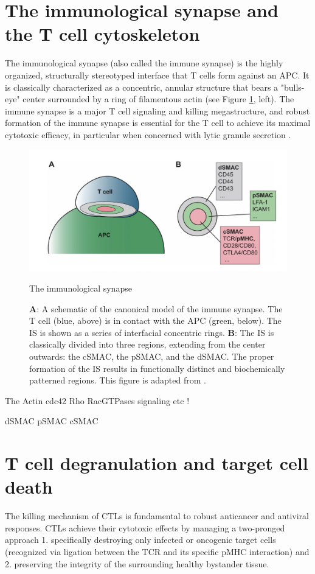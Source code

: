 \section{The immunological synapse and the T cell cytoskeleton}
The immunological synapse (also called the immune synapse) is the highly organized, structurally stereotyped interface that T cells form against an APC. It is classically characterized as a concentric, annular structure that bears a "bulls-eye" center surrounded by a ring of filamentous actin (see Figure \ref{fig:immunesynapse}, left). The immune synapse is a major T cell signaling and killing megastructure, and robust formation of the immune synapse is essential for the T cell to achieve its maximal cytotoxic efficacy, in particular when concerned with lytic granule secretion \cite{Ritter2015}.

\begin{figure}[htbp]
	\centering
	\includegraphics[width=\textwidth]{../figures/chapter1/immunesynapse.png}
	\caption{The immunological synapse}
	\caption*{\textbf{A}: A schematic of the canonical model of the immune synapse. The T cell (blue, above) is in contact with the APC (green, below). The IS is shown as a series of interfacial concentric rings.  \textbf{B}: The IS is classically divided into three regions, extending from the center outwards: the cSMAC, the pSMAC, and the dSMAC.  The proper formation of the IS results in functionally distinct and biochemically patterned regions.  This figure is adapted from \cite{Yu2013}.}
	\label{fig:immunesynapse}
\end{figure}

The 
Actin cdc42 Rho RacGTPases signaling etc !

dSMAC
pSMAC
cSMAC


\section{T cell degranulation and target cell death}
The killing mechanism of CTLs is fundamental to robust anticancer and antiviral responses.  CTLs achieve their cytotoxic effects by managing a two-pronged approach 1. specifically destroying only infected or oncogenic target cells (recognized via ligation between the TCR and its specific pMHC interaction) and 2. preserving the integrity of the surrounding healthy bystander tissue. 

